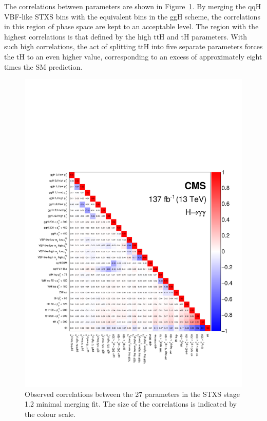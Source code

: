 The correlations between parameters are shown in Figure~\ref{fig:stage1p2_minimal_correlations}. By merging the qqH VBF-like STXS bins with the equivalent bins in the ggH scheme, the correlations in this region of phase space are kept to an acceptable level. The region with the highest correlations is that defined by the high \ptH ttH and tH parameters. With such high correlations, the act of splitting ttH into five separate parameters forces the tH \xsbr to an even higher value, corresponding to an excess of approximately eight times the SM prediction. 


\begin{figure}[htbp]
  \centering
  \includegraphics[width=.93\textwidth]{Figures/hgg_results/stage1p2_minimal_correlations.pdf}
  \caption[Correlations in the STXS stage 1.2 minimal merging parameters]
  {
    Observed correlations between the 27 parameters in the STXS stage 1.2 minimal merging fit. The size of the correlations is indicated by the colour scale.
  }
  \label{fig:stage1p2_minimal_correlations}
\end{figure}

